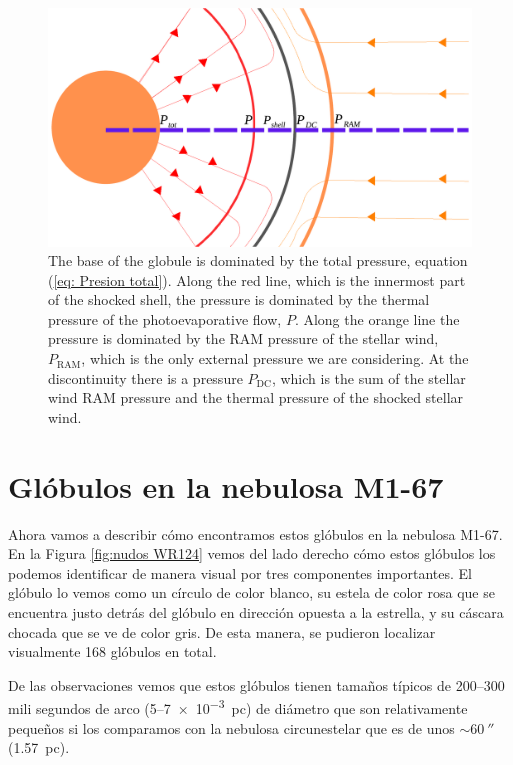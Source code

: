 \documentclass{book}
\begin{document}
\begin{figure}[htb]
    \centering    \includegraphics[width=\textwidth]{imagenes_corregidas/Arreglo 03.pdf}
    \caption{The base of the globule is dominated by the total
      pressure, equation (\ref{eq: Presion total}). Along the red
      line, which is the innermost part of the shocked shell, the
      pressure is dominated by the thermal pressure of the
      photoevaporative flow, $P$. Along the orange line the pressure
      is dominated by the RAM pressure of the stellar wind,
      $P_\mathrm{RAM}$, which is the only external pressure we are
      considering. At the discontinuity there is a pressure
      $P_\mathrm{DC}$, which is the sum of the stellar wind RAM
      pressure and the thermal pressure of the shocked stellar wind.}
    \label{fig:zones_presiones}
\end{figure}





\chapter{Glóbulos en la nebulosa M1-67} \label{Chapter : 3}

Ahora vamos a describir cómo encontramos estos glóbulos en la nebulosa
M1-67. En la Figura \ref{fig:nudos WR124} vemos del lado derecho cómo
estos glóbulos los podemos identificar de manera visual por tres
componentes importantes. El glóbulo lo vemos como un círculo de color
blanco, su estela de color rosa que se encuentra justo detrás del
glóbulo en dirección opuesta a la estrella, y su cáscara chocada que
se ve de color gris. De esta manera, se pudieron localizar visualmente
168 glóbulos en total.

De las observaciones vemos que estos glóbulos tienen tamaños típicos
de 200--300 mili segundos de arco (5--\SI{7e-3}{pc}) de diámetro que son
relativamente pequeños si los comparamos con la nebulosa circunestelar
que es de unos $\sim\SI{60}{\arcsecond}$ (\SI{1.57}{pc}).
\end{document}
